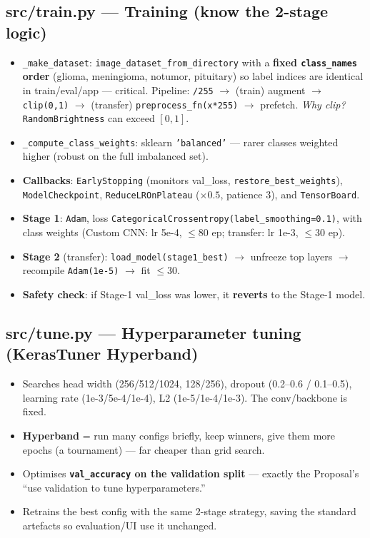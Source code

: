 \documentclass[11pt,a4paper]{article}
\newcommand{\code}[1]{\colorbox{codebg}{\small\texttt{#1}}}
\begin{document}
\subsection{src/train.py --- Training (know the 2-stage logic)}
\begin{itemize}[leftmargin=*,itemsep=1pt]
  \item \texttt{\_make\_dataset}: \texttt{image\_dataset\_from\_directory} with a \textbf{fixed \texttt{class\_names} order}
        (glioma, meningioma, notumor, pituitary) so label indices are identical in train/eval/app --- critical.
        Pipeline: \texttt{/255} $\to$ (train) augment $\to$ \texttt{clip(0,1)} $\to$ (transfer) \texttt{preprocess\_fn(x*255)} $\to$ prefetch.
        \emph{Why clip?} \texttt{RandomBrightness} can exceed $[0,1]$.
  \item \texttt{\_compute\_class\_weights}: sklearn \texttt{'balanced'} --- rarer classes weighted higher (robust on the full imbalanced set).
  \item \textbf{Callbacks}: \texttt{EarlyStopping} (monitors val\_loss, \texttt{restore\_best\_weights}), \texttt{ModelCheckpoint},
        \texttt{ReduceLROnPlateau} ($\times0.5$, patience 3), and \texttt{TensorBoard}.
  \item \textbf{Stage 1}: \code{Adam}, loss \code{CategoricalCrossentropy(label\_smoothing=0.1)}, with class weights
        (Custom CNN: lr 5e-4, $\le$80 ep; transfer: lr 1e-3, $\le$30 ep).
  \item \textbf{Stage 2} (transfer): \code{load\_model(stage1\_best)} $\to$ unfreeze top layers $\to$ recompile \code{Adam(1e-5)} $\to$ fit $\le$30.
  \item \textbf{Safety check}: if Stage-1 val\_loss was lower, it \textbf{reverts} to the Stage-1 model.
\end{itemize}

\subsection{src/tune.py --- Hyperparameter tuning (KerasTuner Hyperband)}
\begin{itemize}[leftmargin=*,itemsep=1pt]
  \item Searches head width (256/512/1024, 128/256), dropout (0.2--0.6 / 0.1--0.5), learning rate (1e-3/5e-4/1e-4), L2 (1e-5/1e-4/1e-3). The conv/backbone is fixed.
  \item \textbf{Hyperband} = run many configs briefly, keep winners, give them more epochs (a tournament) --- far cheaper than grid search.
  \item Optimises \textbf{\code{val\_accuracy} on the validation split} --- exactly the Proposal's ``use validation to tune hyperparameters.''
  \item Retrains the best config with the same 2-stage strategy, saving the standard artefacts so evaluation/UI use it unchanged.
\end{itemize}
\end{document}
